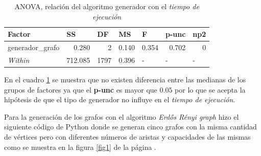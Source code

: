 \documentclass{article}
\begin{document}
\begin{table}[htbp]
  \centering
  \caption{ANOVA, relación del algoritmo generador con el \textit{tiempo de ejecución}}
    \begin{tabular}{lrrrlll}
    \toprule
    \textbf{Factor} & \multicolumn{1}{l}{\textbf{SS}} & \multicolumn{1}{l}{\textbf{DF}} & \multicolumn{1}{l}{\textbf{MS}} & \textbf{F} & \textbf{p-unc} & \textbf{np2} \\
    \midrule
    generador\_grafo & 0.280 & 2     & 0.140 & \multicolumn{1}{r}{0.354} & \multicolumn{1}{r}{0.702} & \multicolumn{1}{r}{0} \\
    \textit{Within} & 712.085 & 1797  & 0.396 & -     & -     & - \\
    \bottomrule
    \end{tabular}%
  \label{tab:t2}%
\end{table}%
En el cuadro \ref{tab:t2} se muestra que no existen diferencia entre las medianas de los grupos de factores ya que el {\bf p-unc} es mayor que $0.05$ por lo que se acepta la hipótesis de que el tipo de generador no influye en el \textit{tiempo de ejecución}.

Para la generación de los grafos con el algoritmo \textit{Erdős Rényi graph} hizo el siguiente código de Python donde  se generan  cinco grafos con la misma cantidad de vértices pero con diferentes números de aristas y capacidades de las mismas como se muestra en la figura \ref{fig1} de la página \pageref{fig1}.

\begin{center}

\end{center} 
   
\end{document}
